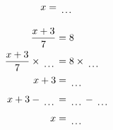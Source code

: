 \documentclass[12pt]{article}
\newcounter{minipagecount}
\begin{document}
\begin{multicols}{2}
\begin{minipage}[t]{0.45\textwidth}
\begin{align*}
        x &= \dotuline{\hspace{5mm}}\\
    \end{align*}
\end{minipage} %
\noindent{(\theminipagecount)}\hspace{0.1mm} %
\begin{minipage}[t]{0.45\textwidth} %
    \vspace{-26pt}  %
    \raggedright %
    \begin{align*} %
        \frac{x + 3}{7} &= 8\\
        \frac{x + 3}{7} \times\dotuline{\hspace{5mm}} &= 8 \times\dotuline{\hspace{5mm}}\\
        x + 3 &= \dotuline{\hspace{5mm}}\\
        x + 3 - \dotuline{\hspace{5mm}} &= \dotuline{\hspace{5mm}} - \dotuline{\hspace{5mm}}\\
        x &= \dotuline{\hspace{5mm}}\\
    \end{align*}
\end{minipage} %
\noindent{(\theminipagecount)}\hspace{0.1mm} %
\begin{minipage}[t]{0.45\textwidth} %
    \vspace{-26pt}  %

\end{minipage}
\end{multicols}
\end{document}
